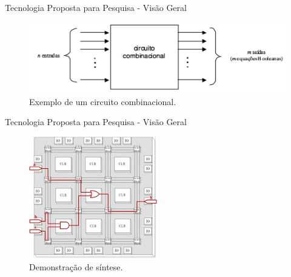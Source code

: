 \documentclass[aspectratio=169]{beamer}
\begin{document}
\begin{frame}{Tecnologia Proposta para Pesquisa - Visão Geral}
	\begin{figure}[H]
		\centering
		\includegraphics[width=1\textwidth]{img/geral1.png}
		\caption{Exemplo de um circuito combinacional.}
	\end{figure}
\end{frame}

\begin{frame}{Tecnologia Proposta para Pesquisa - Visão Geral}
	\begin{figure}[H]
		\centering
		\includegraphics[width=0.5\textwidth]{img/demonstracao.jpg}
		\caption{Demonstração de síntese.}
	\end{figure}
\end{frame}
\end{document}

